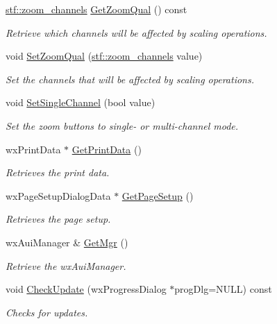 \begin{DoxyCompactItemize}
\hyperlink{group__stfgen_ga9a792b11c01e9429bfe2acd3e4ef108b}{stf::zoom\_\-channels} \hyperlink{classwxStfParentFrame_a279f8734aa7aeaa46b1670e34676ab06}{GetZoomQual} () const 
\begin{DoxyCompactList}\small\item\em Retrieve which channels will be affected by scaling operations. \item\end{DoxyCompactList}\item 
void \hyperlink{classwxStfParentFrame_aecabdd63d19735f613fe31521f6301f2}{SetZoomQual} (\hyperlink{group__stfgen_ga9a792b11c01e9429bfe2acd3e4ef108b}{stf::zoom\_\-channels} value)
\begin{DoxyCompactList}\small\item\em Set the channels that will be affected by scaling operations. \item\end{DoxyCompactList}\item 
void \hyperlink{classwxStfParentFrame_a5ae47eda53d625933468388ba9cda181}{SetSingleChannel} (bool value)
\begin{DoxyCompactList}\small\item\em Set the zoom buttons to single-\/ or multi-\/channel mode. \item\end{DoxyCompactList}\item 
wxPrintData $\ast$ \hyperlink{classwxStfParentFrame_a9636b2e84b4832e7fb17ffc91bc89922}{GetPrintData} ()
\begin{DoxyCompactList}\small\item\em Retrieves the print data. \item\end{DoxyCompactList}\item 
wxPageSetupDialogData $\ast$ \hyperlink{classwxStfParentFrame_a6f73be921151c903b49ef67db2170a58}{GetPageSetup} ()
\begin{DoxyCompactList}\small\item\em Retrieves the page setup. \item\end{DoxyCompactList}\item 
wxAuiManager \& \hyperlink{classwxStfParentFrame_a91607454230f6b6bd2184ee5a758ee6a}{GetMgr} ()
\begin{DoxyCompactList}\small\item\em Retrieve the wxAuiManager. \item\end{DoxyCompactList}\item 
void \hyperlink{classwxStfParentFrame_a1873a7950bcd90ec84d86c8628853640}{CheckUpdate} (wxProgressDialog $\ast$progDlg=NULL) const 
\begin{DoxyCompactList}\small\item\em Checks for updates. \item\end{DoxyCompactList}\end{DoxyCompactItemize}


